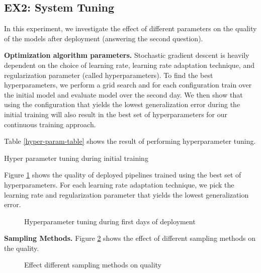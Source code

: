 \subsection{EX2: System Tuning}
In this experiment, we investigate the effect of different parameters on the quality of the models after deployment (answering the second question).

\textbf{Optimization algorithm parameters. }
Stochastic gradient descent is heavily dependent on the choice of learning rate, learning rate adaptation technique, and regularization parameter (called hyperparameters). 
To find the best hyperparameters, we perform a grid search and for each configuration train over the initial model and evaluate model over the second day.
We then show that using the configuration that yields the lowest generalization error during the initial training will also result in the best set of hyperparameters for our continuous training approach.

Table \ref{hyper-param-table} shows the result of performing hyperparameter tuning.
\begin{table}[!h]
\centering
\begin{adjustbox}{max width=\textwidth}

\end{adjustbox}
\caption{Hyper parameter tuning during initial training}
\label{hyper-param-table}
\end{table}

Figure \ref{hyper-param-figure} shows the quality of deployed pipelines trained using the best set of hyperparameters. 
For each learning rate adaptation technique, we pick the learning rate and regularization parameter that yields the lowest generalization error.

\begin{figure}[!h]
\centering
\resizebox{\columnwidth}{!}{}
\caption{Hyperparameter tuning during first days of deployment}
\label{hyper-param-figure}
\end{figure}

\textbf{Sampling Methods. }
Figure \ref{sampling-method-figure} shows the effect of different sampling methods on the quality.
\begin{figure}[!h]
\centering
\resizebox{\columnwidth}{!}{}
\caption{Effect different sampling methods on quality}
\label{sampling-method-figure}
\end{figure}

